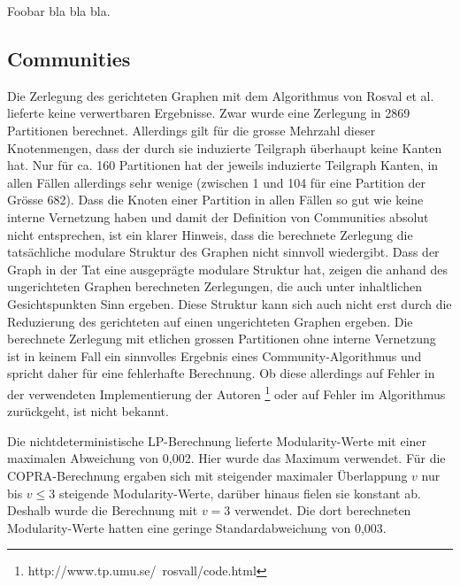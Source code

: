 Foobar bla bla bla.

\subsection{Communities}
\label{sec:result-communities}

Die Zerlegung des gerichteten Graphen mit dem Algorithmus von Rosval
et al. lieferte keine verwertbaren Ergebnisse. Zwar wurde eine
Zerlegung in 2869 Partitionen berechnet. Allerdings gilt f\"ur die
grosse Mehrzahl dieser Knotenmengen, dass der durch sie induzierte
Teilgraph \"uberhaupt keine Kanten hat. Nur f\"ur ca. 160 Partitionen
hat der jeweils induzierte Teilgraph Kanten, in allen F\"allen
allerdings sehr wenige (zwischen 1 und 104 f\"ur eine Partition der
Gr\"osse 682). Dass die Knoten einer Partition in allen F\"allen so
gut wie keine interne Vernetzung haben und damit der Definition von
Communities absolut nicht entsprechen, ist ein klarer Hinweis, dass
die berechnete Zerlegung die tats\"achliche modulare Struktur des
Graphen nicht sinnvoll wiedergibt. Dass der Graph in der Tat eine
ausgepr\"agte modulare Struktur hat, zeigen die anhand des
ungerichteten Graphen berechneten Zerlegungen, die auch unter
inhaltlichen Gesichtspunkten Sinn ergeben. Diese Struktur kann sich
auch nicht erst durch die Reduzierung des gerichteten auf einen
ungerichteten Graphen ergeben. Die berechnete Zerlegung mit etlichen
grossen Partitionen ohne interne Vernetzung ist in keinem Fall ein
sinnvolles Ergebnis eines Community-Algorithmus und spricht daher
f\"ur eine fehlerhafte Berechnung. Ob diese allerdings auf Fehler in
der verwendeten Implementierung der Autoren
\footnote{http://www.tp.umu.se/~rosvall/code.html} oder auf Fehler im
Algorithmus zur\"uckgeht, ist nicht bekannt.

Die nichtdeterministische LP-Berechnung lieferte Modularity-Werte mit
einer maximalen Abweichung von 0,002. Hier wurde das Maximum
verwendet. F\"ur die COPRA-Berechnung ergaben sich mit steigender
maximaler \"Uberlappung $v$ nur bis $v\le 3$ steigende
Modularity-Werte, dar\"uber hinaus fielen sie konstant ab. Deshalb
wurde die Berechnung mit $v=3$ verwendet. Die dort berechneten
Modularity-Werte hatten eine geringe Standardabweichung von 0,003. 

